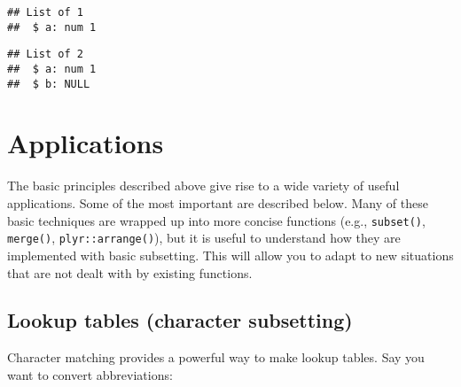 \begin{verbatim}
## List of 1
##  $ a: num 1
\end{verbatim}

\begin{Shaded}
\begin{Highlighting}[]
\StringTok{ }\NormalTok{(} \NormalTok{)}
\NormalTok{y[}\NormalTok{] <-}\StringTok{ }\NormalTok{(}\NormalTok{)}
\end{Highlighting}
\end{Shaded}

\begin{verbatim}
## List of 2
##  $ a: num 1
##  $ b: NULL
\end{verbatim}

\hypertarget{applications}{%
\section{Applications}\label{applications}}

The basic principles described above give rise to a wide variety of
useful applications. Some of the most important are described below.
Many of these basic techniques are wrapped up into more concise
functions (e.g., \texttt{subset()}, \texttt{merge()},
\texttt{plyr::arrange()}), but it is useful to understand how they are
implemented with basic subsetting. This will allow you to adapt to new
situations that are not dealt with by existing functions.

\hypertarget{lookup-tables}{%
\subsection{Lookup tables (character subsetting)}\label{lookup-tables}}

Character matching provides a powerful way to make lookup tables. Say
you want to convert abbreviations: 

\begin{Shaded}
\begin{Highlighting}[]
\StringTok{ }\NormalTok{(}\NormalTok{, }\NormalTok{, }\NormalTok{, }\NormalTok{, }\NormalTok{, }\NormalTok{, }\NormalTok{)}
\StringTok{ }\NormalTok{(} \NormalTok{, } \NormalTok{, } \NormalTok{)}
\end{Highlighting}
\end{Shaded}

